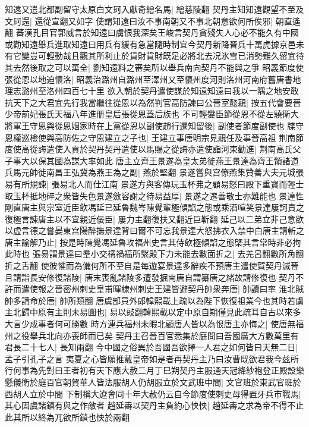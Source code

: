 知遠又遣北都副留守太原白文珂入獻奇繒名馬|{
	繒慈陵翻}
契丹主知知遠觀望不至及文珂還|{
	還從宣翻又如字}
使謂知遠曰汝不事南朝又不事北朝意欲何所俟邪|{
	朝直遙翻}
蕃漢孔目官郭威言於知遠曰虜恨我深矣王峻言契丹貪殘失人心必不能久有中國或勸知遠舉兵進取知遠曰用兵有緩有急當隨時制宜今契丹新降晉兵十萬虎據京邑未有它變豈可輕動哉且觀其所利止於貨財貨財既足必將北去况氷雪已消勢難久留宜待其去然後取之可以萬全|{
	劉知遠料之審矣所以舉兵南向契丹不能與之爭}
昭義節度使張從恩以地迫懷洛|{
	昭義治潞州自潞州至澤州又至懷州度河則洛州河南府舊唐書地理志潞州至洛州四百七十里}
欲入朝於契丹遣使謀於知遠知遠曰我以一隅之地安敢抗天下之大君宜先行我當繼往從恩以為然判官高防諫曰公晉室懿親|{
	按五代會要晉少帝前妃張氏天福八年進册皇后張從恩蓋后族也}
不可輕變臣節從恩不從左驍衛大將軍王守恩與從恩姻家時在上黨從恩以副使趙行遷知留後|{
	副使者節度副使也}
牒守恩權巡檢使與高防佐之守恩建立之子也|{
	王建立事唐明宗見親任及事晉高祖}
荆南節度使高從誨遣使入貢於契丹契丹遣使以馬賜之從誨亦遣使詣河東勸進|{
	荆南高氏父子事大以保其國為謀大率如此}
唐主立齊王景遂為皇太弟徙燕王景達為齊王領諸道兵馬元帥徙南昌王弘冀為燕王為之副|{
	燕於堅翻}
景遂嘗與宫僚燕集贊善大夫元城張易有所規諫|{
	張易北人而仕江南}
景遂方與客傳玩玉杯弗之顧易怒曰殿下重寶而輕士取玉杯抵地碎之衆皆失色景遂斂容謝之待易益厚|{
	景遂之遷善敬士亦難能也}
景達性剛直唐主與宗室近臣飲馮延已延魯魏岑陳覺輩極傾諂之態或乘酒喧笑景達屢訶責之復極言諫唐主以不宜親近佞臣|{
	屢力主翻復扶又翻近巨靳翻}
延己以二弟立非己意欲以虚言德之嘗晏東宫陽醉撫景達背曰爾不可忘我景達大怒拂衣入禁中白唐主請斬之唐主諭解乃止|{
	按是時陳覺馮延魯攻福州史言其侍飲極傾諂之態槩其言常時非必拘此時也}
張易謂景達曰羣小交構禍福所繫殿下力未能去數面折之|{
	去羌呂翻數所角翻折之舌翻}
使彼懼而為備何所不至自是每遊宴景達多辭疾不預唐主遣使賀契丹滅晉且請詣長安修復諸陵|{
	唐末喪亂諸陵多遭發掘南唐自謂纂唐之緒故請修復也}
契丹不許而遣使報之晉密州刺史皇甫暉棣州刺史王建皆避契丹帥衆奔唐|{
	帥讀曰率}
淮北賊帥多請命於唐|{
	帥所類翻}
唐虞部員外郎韓熙載上疏以為陛下恢復祖業今也其時若虜主北歸中原有主則未易圖也|{
	易以䜴翻韓熙載以定中原自期僅見此疏耳自古以來多大言少成事者何可勝數}
時方連兵福州未暇北顧唐人皆以為恨唐主亦悔之|{
	使唐無福州之役舉兵北向亦喪師而已矣}
契丹主召晉百官悉集於庭問曰吾國廣大方數萬里有君長二十七人|{
	長知兩翻}
今中國之俗異於吾國吾欲擇一人君之如何皆曰天無二日|{
	孟子引孔子之言}
夷夏之心皆願推戴皇帝如是者再契丹主乃曰汝曹既欲君我今兹所行何事為先對曰王者初有天下應大赦二月丁巳朔契丹主服通天冠絳紗袍登正殿設樂懸儀衛於庭百官朝賀華人皆法服胡人仍胡服立於文武班中間|{
	文官班於東武官班於西胡人立於中間}
下制稱大遼會同十年大赦仍云自今節度使刺史母得置牙兵市戰馬|{
	其心固虞諸鎮有與之作敵者}
趙延夀以契丹主負約心怏怏|{
	趙延夀之求為帝不得不止此其所以終為兀欲所鎖也怏於兩翻}

